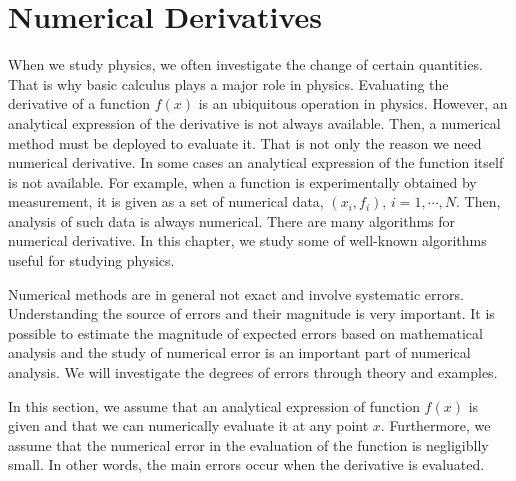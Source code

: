 \chapter{Numerical Derivatives}\label{ch:derivatives}

When we study physics, we often investigate the change of certain quantities.  That is why basic calculus plays a major role in physics.  Evaluating the derivative of a function $f(x)$ is an ubiquitous operation in physics.  However, an analytical expression of the derivative is not always available.  Then, a numerical method must be deployed to evaluate it.  That is not only the reason we need numerical derivative.  In some cases an analytical expression of the function itself is not available.  For example, when a function is experimentally obtained by measurement, it is given as a set of numerical data, $(x_i, f_i),\, i=1, \cdots, N$.  Then, analysis of such data is always numerical.  There are many algorithms for numerical derivative.  In this chapter, we study some of well-known algorithms useful for studying physics.

Numerical methods are in general not exact and involve systematic errors.  Understanding the source of errors and their magnitude is very important.  It is possible to estimate the magnitude of expected errors based on mathematical analysis and the study of numerical error is an important part of numerical analysis.  We will investigate the degrees of errors through theory and examples.

In this section, we assume that an analytical expression of function $f(x)$ is given and that we can numerically evaluate it at any point $x$. Furthermore, we assume that the numerical error in the evaluation of the function is negligiblly small.  In other words, the main errors occur when the derivative is evaluated. 


